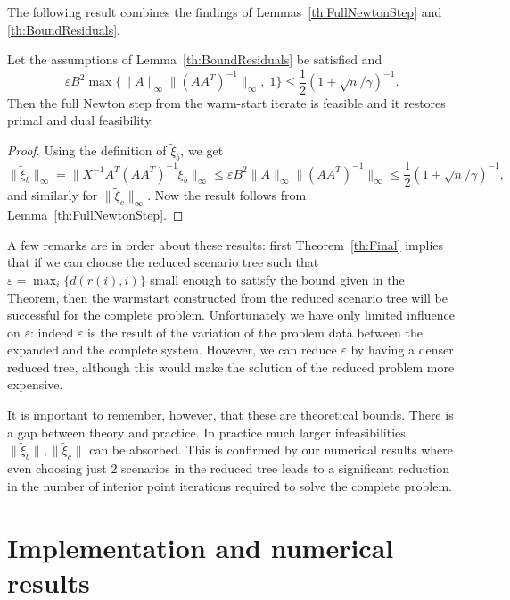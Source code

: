 The following result combines the findings of Lemmas~\ref{th:FullNewtonStep} 
and \ref{th:BoundResiduals}. 
%
\begin{theorem}  \label{th:Final}
Let the assumptions of Lemma~\ref{th:BoundResiduals} be satisfied and 
\[
\varepsilon B^2 \max\{\|A\|_\infty\|(AA^T)^{-1}\|_\infty, \; 1\} 
   \le \frac{1}{2} \left(1+\sqrt{n} / \gamma \right)^{-1}.
\]
Then the full Newton step from the warm-start iterate is feasible 
and it restores primal and dual feasibility.
\end{theorem}
%
\begin{proof}
Using the definition of $\tilde{\xi}_b$, we get
\[
\| \tilde{\xi}_b \|_{\infty} = \| X^{-1} A^T (AA^T)^{-1} \xi_b \|_{\infty} 
    \le
    \varepsilon B^2 \|A\|_{\infty} \|(AA^T)^{-1}\|_{\infty} 
    \le \frac{1}{2} \left(1+\sqrt{n} / \gamma \right)^{-1},
\]
and similarly for $\|\tilde{\xi}_c\|_{\infty}$.
Now the result follows from  Lemma~\ref{th:FullNewtonStep}. 
\end{proof}

A few remarks are in order about these results: first
Theorem~\ref{th:Final} implies that if we can choose the reduced
scenario tree such that $\varepsilon = \max_i\{d(r(i),i)\}$ small enough
to satisfy the bound given in the Theorem, then the warmstart
constructed from the reduced scenario tree will be successful for the
complete problem. Unfortunately we have only limited influence on
$\varepsilon$: indeed $\varepsilon$ is the result of the variation of
the problem data between the expanded and the complete system.
However, we can reduce $\varepsilon$ by having a
denser reduced tree, although this would make the solution of the
reduced problem more expensive.


It is important to remember, however,
that these are theoretical bounds. There is a gap between theory and
practice. In practice much larger infeasibilities 
$\|\tilde{\xi}_b\|, \|\tilde{\xi}_c\|$ can be absorbed. This is
confirmed by our numerical results where even choosing just 2
scenarios in the reduced tree leads to a significant reduction in the
number of interior point iterations required to solve the complete problem.


%
%
\section{Implementation and numerical results}
\label{sec:Results}

